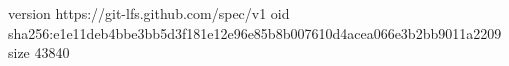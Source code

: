 version https://git-lfs.github.com/spec/v1
oid sha256:e1e11deb4bbe3bb5d3f181e12e96e85b8b007610d4acea066e3b2bb9011a2209
size 43840
